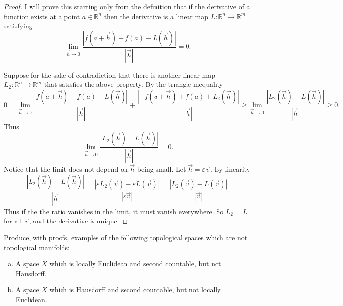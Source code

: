 \documentclass{article}
\newenvironment{problem}[2][Problem]{\begin{trivlist}
\item[\hskip \labelsep {\bfseries #1}\hskip \labelsep {\bfseries #2.}]}{\end{trivlist}}
\begin{document}
\begin{proof}
  I will prove this starting only from the definition that if the derivative of
  a function exists at a point $a \in \mathbb{R}^n$ then the derivative is a
  linear map $L: \mathbb{R}^n \rightarrow \mathbb{R}^m$ satisfying \[
    \lim_{\vec{h} \rightarrow 0}
      \frac{|f(a + \vec{h}) - f(a) - L(\vec{h})|}{|\vec{h}|} = 0.
  \]

  Suppose for the sake of contradiction that there is another linear map
  $L_2: \mathbb{R}^n \rightarrow \mathbb{R}^m$ that satisfies the above property.
  By the triangle inequality \[
    0 = \lim_{\vec{h} \rightarrow 0}
      \frac{|f(a + \vec{h}) - f(a) - L(\vec{h})|}{|\vec{h}|} +
      \frac{|-f(a + \vec{h}) + f(a) + L_2(\vec{h})|}{|\vec{h}|}
      \geq \lim_{\vec{h} \rightarrow 0} \frac{|L_2(\vec{h}) - L(\vec{h})|}{|\vec{h}|}
      \geq 0.
  \] Thus \[
    \lim_{\vec{h} \rightarrow 0} \frac{|L_2(\vec{h}) - L(\vec{h})|}{|\vec{h}|} = 0.
  \]
  Notice that the limit does not depend on $\vec{h}$ being small.
  Let $\vec{h} = \varepsilon\vec{v}$. By linearity \[
    \frac{|L_2(\vec{h}) - L(\vec{h})|}{|\vec{h}|}
    = \frac{|\varepsilon L_2(\vec{v}) - \varepsilon L(\vec{v})|}{|\varepsilon\vec{v}|}
    = \frac{| L_2(\vec{v}) -  L(\vec{v})|}{|\vec{v}|}.
  \] Thus if the the ratio vanishes in the limit, it must vanish everywhere.
  So $L_2 = L$ for all $\vec{v}$, and the derivative is unique.
\end{proof}

\pagebreak

\begin{problem}{5}
  Produce, with proofs, examples of the following topological spaces which are
  not topological manifolds: \begin{enumerate}[a)]
    \item A space $X$ which is locally Euclidean and second countable,
      but not Hausdorff.
    \item A space $X$ which is Hausdorff and second countable, but not locally
      Euclidean.
  \end{enumerate}
\end{problem}
\end{document}
